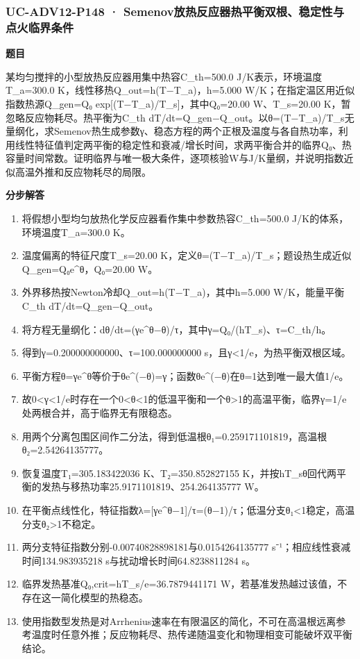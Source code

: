 \documentclass[UTF8,11pt,a4paper]{ctexart}
\begin{document}
\subsubsection*{UC-ADV12-P148 · Semenov放热反应器热平衡双根、稳定性与点火临界条件}
\noindent\textbf{题目}\par
某均匀搅拌的小型放热反应器用集中热容C\_th=500.0 J/K表示，环境温度T\_a=300.0 K，线性移热Q\_out=h(T−T\_a)，h=5.000 W/K；在指定温区用近似指数热源Q\_gen=Q₀ exp[(T−T\_a)/T\_s]，其中Q₀=20.00 W、T\_s=20.00 K，暂忽略反应物耗尽。热平衡为C\_th dT/dt=Q\_gen−Q\_out。以θ=(T−T\_a)/T\_s无量纲化，求Semenov热生成参数γ、稳态方程的两个正根及温度与各自热功率，利用线性特征值判定两平衡的稳定性和衰减/增长时间，求两平衡合并的临界Q₀、热容量时间常数。证明临界与唯一极大条件，逐项核验W与J/K量纲，并说明指数近似高温外推和反应物耗尽的局限。\par
\medskip\noindent\textbf{分步解答}
\begin{enumerate}
\item 将假想小型均匀放热化学反应器看作集中参数热容C\_th=500.0 J/K的体系，环境温度T\_a=300.0 K。
\item 温度偏离的特征尺度T\_s=20.00 K，定义θ=(T−T\_a)/T\_s；题设热生成近似Q\_gen=Q₀e\textasciicircum{}θ，Q₀=20.00 W。
\item 外界移热按Newton冷却Q\_out=h(T−T\_a)，其中h=5.000 W/K，能量平衡C\_th dT/dt=Q\_gen−Q\_out。
\item 将方程无量纲化：dθ/dt=(γe\textasciicircum{}θ−θ)/τ，其中γ=Q₀/(hT\_s)、τ=C\_th/h。
\item 得到γ=0.200000000000、τ=100.000000000 s，且γ<1/e，为热平衡双根区域。
\item 平衡方程θ=γe\textasciicircum{}θ等价于θe\textasciicircum{}(−θ)=γ；函数θe\textasciicircum{}(−θ)在θ=1达到唯一最大值1/e。
\item 故0<γ<1/e时存在一个0<θ<1的低温平衡和一个θ>1的高温平衡，临界γ=1/e处两根合并，高于临界无有限稳态。
\item 用两个分离包围区间作二分法，得到低温根θ₁=0.259171101819，高温根θ₂=2.54264135777。
\item 恢复温度T₁=305.183422036 K、T₂=350.852827155 K，并按hT\_sθ回代两平衡的发热与移热功率25.9171101819、254.264135777 W。
\item 在平衡点线性化，特征指数λ=[γe\textasciicircum{}θ−1]/τ=(θ−1)/τ；低温分支θ₁<1稳定，高温分支θ₂>1不稳定。
\item 两分支特征指数分别-0.00740828898181与0.0154264135777 s⁻¹；相应线性衰减时间134.983935218 s与扰动增长时间64.8238811284 s。
\item 临界发热基准Q₀,crit=hT\_s/e=36.7879441171 W，若基准发热越过该值，不存在这一简化模型的热稳态。
\item 使用指数型发热是对Arrhenius速率在有限温区的简化，不可在高温根远离参考温度时任意外推；反应物耗尽、热传递随温变化和物理相变可能破坏双平衡结论。
\end{enumerate}
\end{document}
